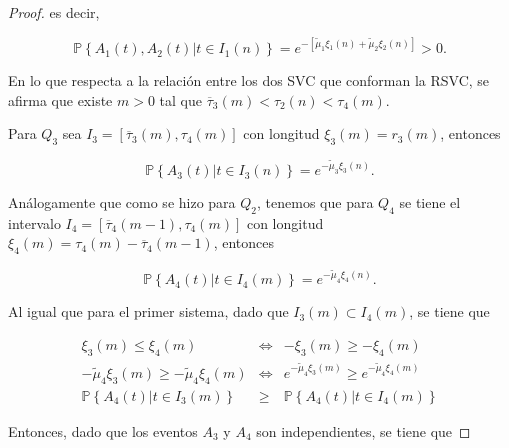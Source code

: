 \documentclass{article}
\newcommand{\prob}{\mathbb{P}}
\begin{document}
\begin{proof}
es decir, 

\begin{equation}
\prob\left\{A_{1}\left(t\right),A_{2}\left(t\right)|t\in I_{1}\left(n\right)\right\}
=e^{-\left[\tilde{\mu}_{1}\xi_{1}\left(n\right)+\tilde{\mu}_{2}\xi_{2}
\left(n\right)\right]}>0.
\end{equation}

En lo que respecta a la relaci\'on entre los dos SVC que conforman la RSVC, se afirma que existe $m>0$ tal que $\overline{\tau}_{3}\left(m\right)<\tau_{2}\left(n\right)<\tau_{4}\left(m\right)$.

Para $Q_{3}$ sea $I_{3}=\left[\overline{\tau}_{3}\left(m\right),\tau_{4}\left(m\right)\right]$ con longitud  $\xi_{3}\left(m\right)=r_{3}\left(m\right)$, entonces 

\begin{equation}
\prob\left\{A_{3}\left(t\right)|t\in I_{3}\left(n\right)\right\}=e^{-\tilde{\mu}_{3}\xi_{3}\left(n\right)}.
\end{equation} 

An\'alogamente que como se hizo para $Q_{2}$, tenemos que para $Q_{4}$ se tiene el intervalo $I_{4}=\left[\overline{\tau}_{4}\left(m-1\right),\tau_{4}\left(m\right)\right]$ con longitud $\xi_{4}\left(m\right)=\tau_{4}\left(m\right)-\overline{\tau}_{4}\left(m-1\right)$, entonces


\begin{equation}
\prob\left\{A_{4}\left(t\right)|t\in I_{4}\left(m\right)\right\}=e^{-\tilde{\mu}_{4}\xi_{4}\left(n\right)}.
\end{equation} 

Al igual que para el primer sistema, dado que $I_{3}\left(m\right)\subset I_{4}\left(m\right)$, se tiene que

\begin{eqnarray*}
\xi_{3}\left(m\right)\leq\xi_{4}\left(m\right)&\Leftrightarrow& -\xi_{3}\left(m\right)\geq-\xi_{4}\left(m\right)
\\
-\tilde{\mu}_{4}\xi_{3}\left(m\right)\geq-\tilde{\mu}_{4}\xi_{4}\left(m\right)&\Leftrightarrow&
e^{-\tilde{\mu}_{4}\xi_{3}\left(m\right)}\geq e^{-\tilde{\mu}_{4}\xi_{4}\left(m\right)}\\
\prob\left\{A_{4}\left(t\right)|t\in I_{3}\left(m\right)\right\}&\geq&
\prob\left\{A_{4}\left(t\right)|t\in I_{4}\left(m\right)\right\}
\end{eqnarray*}

Entonces, dado que los eventos $A_{3}$ y $A_{4}$ son independientes, se tiene que


\end{proof}
\end{document}
